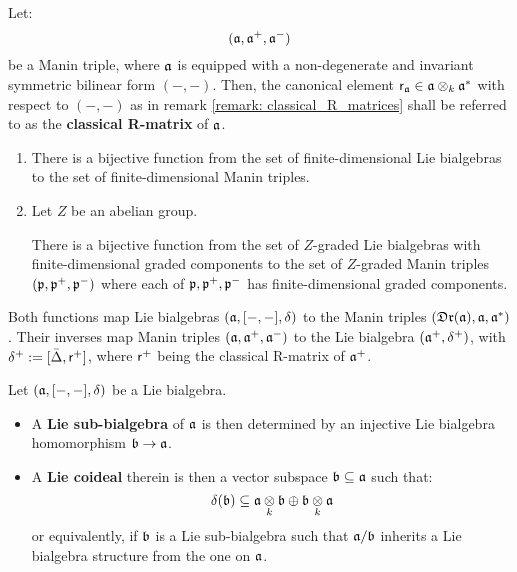         \begin{definition} \label{def: classical_R_matrices}
            Let:
                $$(\mathfrak{a}, \mathfrak{a}^+, \mathfrak{a}^-)$$
            be a Manin triple, where $\mathfrak{a}$ is equipped with a non-degenerate and invariant symmetric bilinear form $(-, -)$. Then, the canonical element $\sfr_{\a} \in \a \tensor_k \a^*$ with respect to $(-, -)$ as in remark \ref{remark: classical_R_matrices} shall be referred to as the \textbf{classical R-matrix} of $\mathfrak{a}$.
        \end{definition}
        \begin{lemma} \label{lemma: lie_bialgebras_from_manin_triples}
            \begin{enumerate}
                \item \cite[Proposition 1.3.4 and Lemma 1.3.5]{chari_pressley_quantum_groups} There is a bijective function from the set of finite-dimensional Lie bialgebras to the set of finite-dimensional Manin triples.
                \item Let $Z$ be an abelian group. 

                There is a bijective function from the set of $Z$-graded Lie bialgebras with finite-dimensional graded components to the set of $Z$-graded Manin triples $(\mathfrak{p}, \mathfrak{p}^+, \mathfrak{p}^-)$ where each of $\mathfrak{p}, \mathfrak{p}^+, \mathfrak{p}^-$ has finite-dimensional graded components.
            \end{enumerate}
            Both functions map Lie bialgebras $(\mathfrak{a}, [-, -], \delta)$ to the Manin triples $(\mathfrak{Dr}(\mathfrak{a}), \mathfrak{a}, \mathfrak{a}^*)$. Their inverses map Manin triples $(\mathfrak{a}, \mathfrak{a}^+, \mathfrak{a}^-)$ to the Lie bialgebra $(\mathfrak{a}^+, \delta^+)$, with $\delta^+ := [\bar{\Delta}, \mathsf{r}^+]$, where $\mathsf{r}^+$ being the classical R-matrix of $\mathfrak{a}^+$.
        \end{lemma}
        \begin{definition} \label{def: lie_sub_bialgebras_and_lie_coideals}
            Let $(\mathfrak{a}, [-, -], \delta)$ be a Lie bialgebra.
            \begin{itemize}
                \item A \textbf{Lie sub-bialgebra} of $\mathfrak{a}$ is then determined by an injective Lie bialgebra homomorphism $\mathfrak{b} \to \mathfrak{a}$. 
                \item A \textbf{Lie coideal} therein is then a vector subspace $\mathfrak{b} \subseteq \mathfrak{a}$ such that:
                    $$\delta(\b) \subseteq \a \tensor_k \b \oplus \b \tensor_k \a$$
                or equivalently, if $\mathfrak{b}$ is a Lie sub-bialgebra such that $\mathfrak{a}/\mathfrak{b}$ inherits a Lie bialgebra structure from the one on $\mathfrak{a}$.
            \end{itemize}
        \end{definition}
